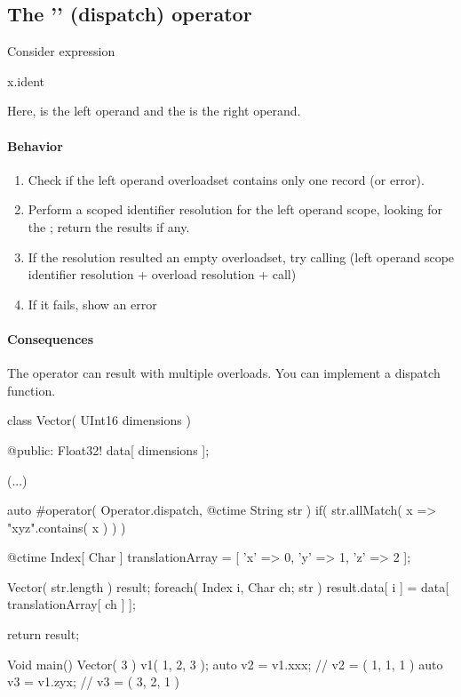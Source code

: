 \subsection{The '' (dispatch) operator}
Consider expression
\begin{code}
x.ident
\end{code}

Here,  is the left operand and the  is the right operand.

\paragraph{Behavior}
\begin{enumerate}
	\item Check if the left operand overloadset contains only one record (or error).
	\item Perform a scoped identifier resolution for the left operand scope, looking for the ; return the results if any.
	\item If the resolution resulted an empty overloadset, try calling (left operand scope identifier resolution + overload resolution + call)\\ 
	\item If it fails, show an error
\end{enumerate}

\paragraph{Consequences}
The  operator can result with multiple overloads. You can implement a dispatch function.

\begin{code}
class Vector( UInt16 dimensions ) {

@public:
	Float32! data[ dimensions ];
	
	(...)
	
	auto #operator( Operator.dispatch, @ctime String str )
		if( str.allMatch( x => "xyz".contains( x ) ) )
	{
		@ctime Index[ Char ] translationArray = [
			'x' => 0,
			'y' => 1,
			'z' => 2
		];
		
		Vector( str.length )	result;
		foreach( Index i, Char ch; str )
			result.data[ i ] = data[ translationArray[ ch ] ];
			
		return result;
	}
			

}

Void main() {
	Vector( 3 ) v1( 1, 2, 3 );
	auto v2 = v1.xxx; // v2 = ( 1, 1, 1 )
	auto v3 = v1.zyx; // v3 = ( 3, 2, 1 )
}
\end{code}

